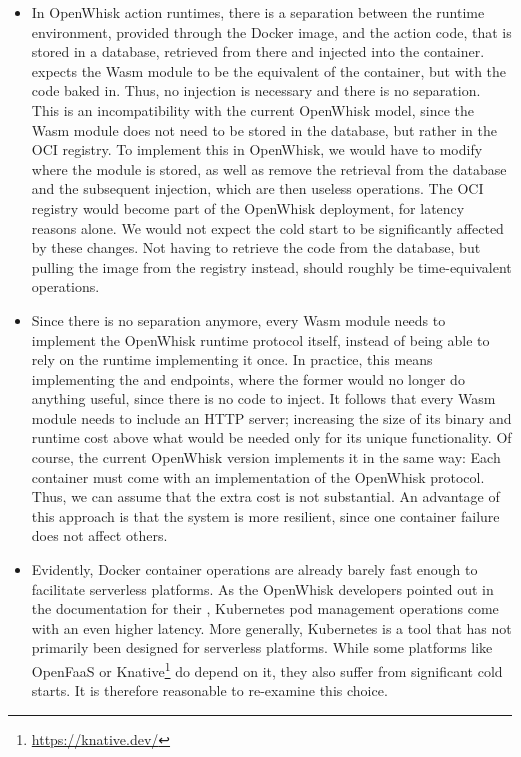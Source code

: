 \begin{itemize}
    \item In OpenWhisk action runtimes, there is a separation between the runtime environment, provided through the Docker image, and the action code, that is stored in a database, retrieved from there and injected into the container.  expects the Wasm module to be the equivalent of the container, but with the code baked in. Thus, no injection is necessary and there is no separation. This is an incompatibility with the current OpenWhisk model, since the Wasm module does not need to be stored in the database, but rather in the OCI registry. To implement this in OpenWhisk, we would have to modify where the module is stored, as well as remove the retrieval from the database and the subsequent injection, which are then useless operations. The OCI registry would become part of the OpenWhisk deployment, for latency reasons alone. We would not expect the cold start to be significantly affected by these changes. Not having to retrieve the code from the database, but pulling the image from the registry instead, should roughly be time-equivalent operations.
    \item Since there is no separation anymore, every Wasm module needs to implement the OpenWhisk runtime protocol itself, instead of being able to rely on the runtime implementing it once. In practice, this means implementing the  and  endpoints, where the former would no longer do anything useful, since there is no code to inject. It follows that every Wasm module needs to include an HTTP server; increasing the size of its binary and runtime cost above what would be needed only for its unique functionality. Of course, the current OpenWhisk version implements it in the same way: Each container must come with an implementation of the OpenWhisk protocol. Thus, we can assume that the extra cost is not substantial. An advantage of this approach is that the system is more resilient, since one container failure does not affect others.
    \item Evidently, Docker container operations are already barely fast enough to facilitate serverless platforms. As the OpenWhisk developers pointed out in the documentation for their , Kubernetes pod management operations come with an even higher latency. More generally, Kubernetes is a tool that has not primarily been designed for serverless platforms. While some platforms like OpenFaaS or Knative\footnote{\url{https://knative.dev/}}  do depend on it, they also suffer from significant cold starts. It is therefore reasonable to re-examine this choice.

\end{itemize}

